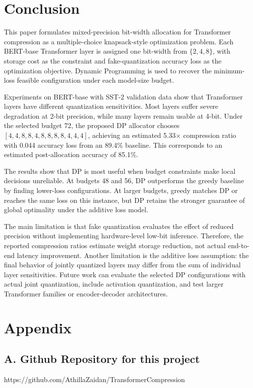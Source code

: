 \documentclass[conference]{IEEEtran}
\begin{document}
\section{Conclusion}
This paper formulates mixed-precision bit-width allocation for Transformer compression as a multiple-choice knapsack-style optimization problem. Each BERT-base Transformer layer is assigned one bit-width from $\{2,4,8\}$, with storage cost as the constraint and fake-quantization accuracy loss as the optimization objective. Dynamic Programming is used to recover the minimum-loss feasible configuration under each model-size budget.

Experiments on BERT-base with SST-2 validation data show that Transformer layers have different quantization sensitivities. Most layers suffer severe degradation at 2-bit precision, while many layers remain usable at 4-bit. Under the selected budget 72, the proposed DP allocator chooses $[4,4,8,8,4,8,8,8,8,4,4,4]$, achieving an estimated 5.33$\times$ compression ratio with 0.044 accuracy loss from an 89.4\% baseline. This corresponds to an estimated post-allocation accuracy of 85.1\%.

The results show that DP is most useful when budget constraints make local decisions unreliable. At budgets 48 and 56, DP outperforms the greedy baseline by finding lower-loss configurations. At larger budgets, greedy matches DP or reaches the same loss on this instance, but DP retains the stronger guarantee of global optimality under the additive loss model.

The main limitation is that fake quantization evaluates the effect of reduced precision without implementing hardware-level low-bit inference. Therefore, the reported compression ratios estimate weight storage reduction, not actual end-to-end latency improvement. Another limitation is the additive loss assumption: the final behavior of jointly quantized layers may differ from the sum of individual layer sensitivities. Future work can evaluate the selected DP configurations with actual joint quantization, include activation quantization, and test larger Transformer families or encoder-decoder architectures.

\section*{Appendix}
\subsection*{A. Github Repository for this project}
https://github.com/AthillaZaidan/TransformerCompression
\end{document}
